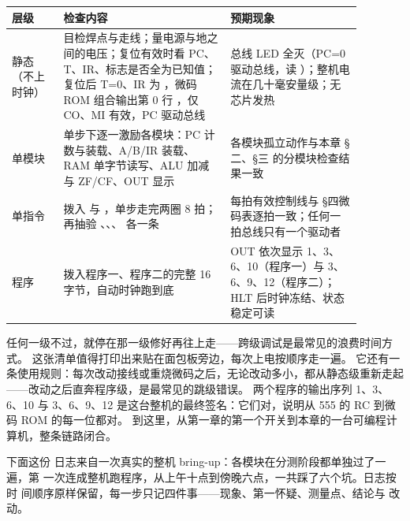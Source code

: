\begin{longtable}{L{0.13\linewidth}L{0.42\linewidth}L{0.33\linewidth}}
\toprule
层级 & 检查内容 & 预期现象 \\
\midrule
静态（不上时钟） & 目检焊点与走线；量电源与地之间的电压；复位有效时看 PC、T、IR、标志是否全为已知值；复位后 T=0、IR 为 ，微码 ROM 组合输出第 0 行 ，仅 CO、MI 有效，PC 驱动总线 & 总线 LED 全灭（PC=0 驱动总线，读 ）；整机电流在几十毫安量级；无芯片发热 \\
单模块 & 单步下逐一激励各模块：PC 计数与装载、A/B/IR 装载、RAM 单字节读写、ALU 加减与 ZF/CF、OUT 显示 & 各模块孤立动作与本章 §二、§三 的分模块检查结果一致 \\
单指令 & 拨入  与 ，单步走完两圈 8 拍；再抽验 、、、 各一条 & 每拍有效控制线与 §四微码表逐拍一致；任何一拍总线只有一个驱动者 \\
程序 & 拨入程序一、程序二的完整 16 字节，自动时钟跑到底 & OUT 依次显示 1、3、6、10（程序一）与 3、6、9、12（程序二）；HLT 后时钟冻结、状态稳定可读 \\
\bottomrule
\end{longtable}

任何一级不过，就停在那一级修好再往上走——跨级调试是最常见的浪费时间方式。
这张清单值得打印出来贴在面包板旁边，每次上电按顺序走一遍。
它还有一条使用规则：每次改动接线或重烧微码之后，无论改动多小，都从静态级重新走起——改动之后直奔程序级，是最常见的跳级错误。
两个程序的输出序列 1、3、6、10 与 3、6、9、12 是这台整机的最终签名：它们对，说明从 555 的 RC 到微码 ROM 的每一位都对。
到这里，从第一章的第一个开关到本章的一台可编程计算机，整条链路闭合。

下面这份
日志来自一次真实的整机 bring-up：各模块在分测阶段都单独过了一遍，第
一次连成整机跑程序，从上午十点到傍晚六点，一共踩了六个坑。日志按时
间顺序原样保留，每一步只记四件事——现象、第一怀疑、测量点、结论与
改动。

